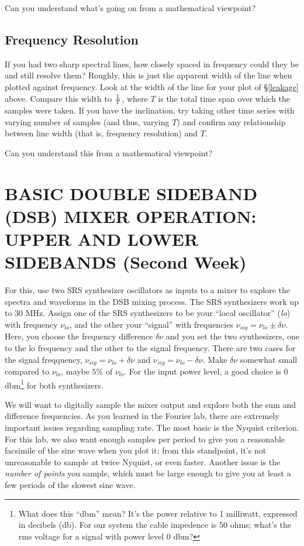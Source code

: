 \documentclass[11pt,preprint]{aastex}
\begin{document}
Can you understand what's going on from a mathematical viewpoint?

\subsection{Frequency Resolution}

If you had two sharp spectral lines, how closely spaced in frequency
could they be and still resolve them? Roughly, this is just the apparent
width of the line when plotted against frequency. Look at the width of
the line for your plot of \S \ref{leakage} above. Compare this width to
$1 \over T$, where $T$ is the total time span over which the samples
were taken. If you have the inclination, try taking other time series
with varying number of samples (and thus, varying $T$) and confirm any
relationship between line width (that is, frequency resolution) and
$T$.

Can you understand this from a mathematical viewpoint?

\section{ BASIC DOUBLE SIDEBAND (DSB) MIXER OPERATION: UPPER AND LOWER
  SIDEBANDS (Second Week)}
\label{upperlowerdsb}

        For this, use two SRS synthesizer oscillators as inputs to a
mixer to explore the spectra and waveforms in the DSB mixing process.
The SRS synthesizers work up to 30 MHz.  Assign one of the SRS
synthesizers to be your ``local oscillator'' ({\it lo}) with frequency
$\nu_{lo}$, and the other your ``signal'' with frequencies $\nu_{sig} =
\nu_{lo} \pm \delta \nu$.  Here, you choose the frequency difference
$\delta \nu$ and you set the two synthesizers, one to the lo
frequency and the other to the signal frequency. There are two cases for
the signal freqquency, $\nu_{sig} = \nu_{lo} + \delta \nu$ and
$\nu_{sig} = \nu_{lo} - \delta \nu$.  Make $\delta \nu$ somewhat small
compared to $\nu_{lo}$, maybe $5\%$ of $\nu_{lo}$.  For the input power
level, a good choice is 0 dbm\footnote{What does this ``dbm'' mean? It's
the power relative to 1 milliwatt, expressed in decibels (db). For our
system the cable impedence is 50 ohms; what's the rms voltage for a
signal with power level 0 dbm?} for both synthesizers.

        We will want to digitally sample the mixer output and explore
both the sum and difference frequencies. As you learned in the Fourier
lab, there are extremely important issues regarding sampling rate. The
most basic is the Nyquist criterion. For this lab, we also want enough
samples per period to give you a reasonable facsimile of the sine wave
when you plot it; from this standpoint, it's not unreasonable to sample
at twice Nyquist, or even faster.  Another issue is the {\it number of
points} you sample, which must be large enough to give you at least a
few periods of the slowest sine wave.
\end{document}

